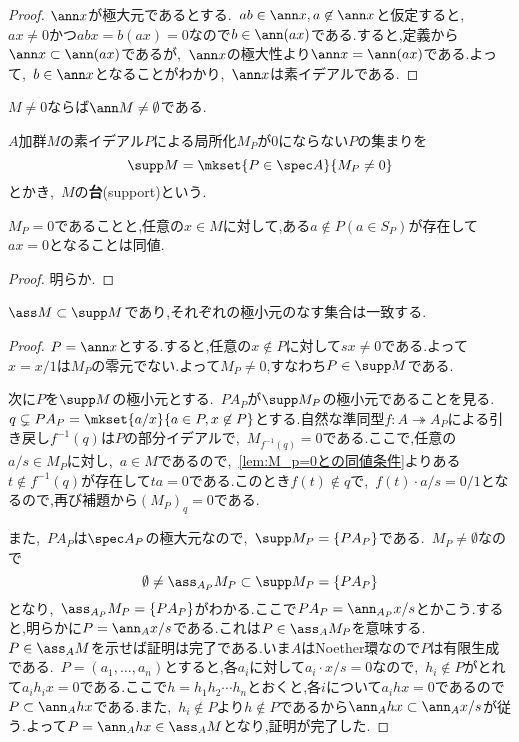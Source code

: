 \begin{proof}
	$\ann x$が極大元であるとする.~$ab\in\ann x,a\not\in\ann x$と仮定すると,~$ax\neq0$かつ$abx=b(ax)=0$なので$b\in\ann(ax)$である.すると,定義から$\ann x\subset\ann(ax)$であるが,~$\ann x$の極大性より$\ann x=\ann(ax)$である.よって,~$b\in\ann x$となることがわかり,~$\ann x$は素イデアルである.
\end{proof}

\begin{cor}\label{cor:Mneq0ならann Mは空でない}
	$M\neq0$ならば$\ann M\neq\emptyset$である.
\end{cor}

\begin{defi}[台]
	$A$加群$M$の素イデアル$ P$による局所化$M_ P$が0にならない$ P$の集まりを
	\[\supp M=\mkset{ P\in\spec A}{M_ P\neq 0}\]
	とかき,~$M$の\textbf{台}(support)という.
\end{defi}

\begin{lem}\label{lem:M_p=0との同値条件}
	$M_ P=0$であることと,任意の$x\in M$に対して,ある$a\not\in P(a\in S_ P)$が存在して$ax=0$となることは同値.
\end{lem}

\begin{proof}
	明らか.
\end{proof}

\begin{thm}\label{thm:assとsuppの極小元}
	$\ass M\subset\supp M$であり,それぞれの極小元のなす集合は一致する.
\end{thm}

\begin{proof}
	$ P=\ann x$とする.すると,任意の$x\not\in P$に対して$sx\neq0$である.よって$x=x/1$は$M_ P$の零元でない.よって$M_ P\neq0$,すなわち$ P\in\supp M$である.
	
	次に$ P$を$\supp M$の極小元とする.~$ PA_ P$が$\supp  M_ P$の極小元であることを見る.~$ q\subsetneq  PA_ P=\mkset{a/x}{a\in P,x\not\in P}$とする.自然な準同型$f:A\twoheadrightarrow A_ P$による引き戻し$f^{-1}( q)$は$ P$の部分イデアルで,~$M_{f^{-1}( q)}=0$である.ここで,任意の$a/s\in M_ P$に対し,~$a\in M$であるので,~\ref{lem:M_p=0との同値条件}よりある$t\not\in f^{-1}( q)$が存在して$ta=0$である.このとき$f(t)\not\in q$で,~$f(t)\cdot a/s=0/1$となるので,再び補題から$(M_ P)_ q=0$である.
	
	また,~$ PA_ P$は$\spec A_ P$の極大元なので,~$\supp M_ P=\{ PA_ P\}$である.~$M_ P\neq\emptyset$なので
	\[\emptyset\neq\ass_{A_ P}M_ P\subset\supp M_ P=\{ PA_ P\}\]
	となり,~$\ass_{A_ P}M_ P=\{ PA_ P\}$がわかる.ここで$ PA_ P=\ann_{A_ P}x/s$とかこう.すると,明らかに$ P=\ann_A x/s$である.これは$ P\in\ass_A M_ P$を意味する.~$ P\in\ass_A M$を示せば証明は完了である.いま$A$はNoether環なので$ P$は有限生成である.~$ P=(a_1,\dots,a_n)$とすると,各$a_i$に対して$a_i\cdot x/s=0$なので,~$h_i\not\in P$がとれて$a_ih_ix=0$である.ここで$h=h_1h_2\cdots h_n$とおくと,各$i$について$a_ihx=0$であるので$ P\subset\ann_A hx$である.また,~$h_i\not\in P$より$h\not\in P$であるから$\ann_Ahx\subset\ann_Ax/s$が従う.よって$ P=\ann_Ahx\in\ass_AM$となり,証明が完了した.
\end{proof}

